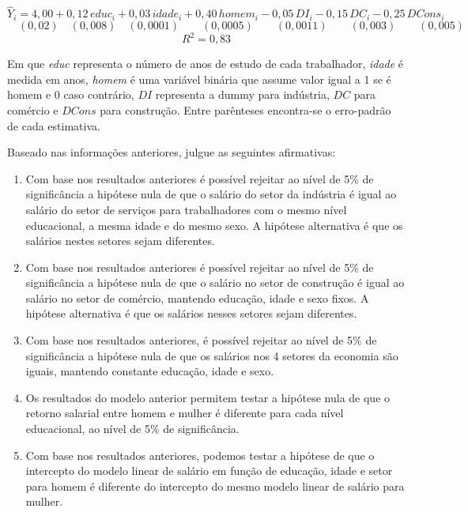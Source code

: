 \documentclass[12pt,letterpaper,onecolumn]{exam}
\begin{document}
\begin{questions}
\[
\hat{Y}_i = 4{,}00 + 0{,}12\,educ_i + 0{,}03\,idade_i + 0{,}40\,homem_i - 0{,}05\,DI_i - 0{,}15\,DC_i - 0{,}25\,DCons_i
\]
\vspace{-0.8cm}
\[
\quad (0{,}02)\quad (0{,}008)\quad (0{,}0001)\qquad (0{,}0005)\qquad (0{,}0011)\qquad (0{,}003)\qquad (0{,}005)
\]
\[
R^2 = 0{,}83
\]

Em que \textit{educ} representa o número de anos de estudo de cada trabalhador, \textit{idade} é medida em anos, \textit{homem} é uma variável binária que assume valor igual a 1 se é homem e 0 caso contrário, \(DI\) representa a dummy para indústria, \(DC\) para comércio e \(DCons\) para construção. Entre parênteses encontra-se o erro-padrão de cada estimativa.

Baseado nas informações anteriores, julgue as seguintes afirmativas:
\begin{enumerate}[label=(\arabic*)]
    \item Com base nos resultados anteriores é possível rejeitar ao nível de 5\% de significância a hipótese nula de que o salário do setor da indústria é igual ao salário do setor de serviços para trabalhadores com o mesmo nível educacional, a mesma idade e do mesmo sexo. A hipótese alternativa é que os salários nestes setores sejam diferentes.
    \item Com base nos resultados anteriores é possível rejeitar ao nível de 5\% de significância a hipótese nula de que o salário no setor de construção é igual ao salário no setor de comércio, mantendo educação, idade e sexo fixos. A hipótese alternativa é que os salários nesses setores sejam diferentes.
    \item Com base nos resultados anteriores, é possível rejeitar ao nível de 5\% de significância a hipótese nula de que os salários nos 4 setores da economia são iguais, mantendo constante educação, idade e sexo.
    \item Os resultados do modelo anterior permitem testar a hipótese nula de que o retorno salarial entre homem e mulher é diferente para cada nível educacional, ao nível de 5\% de significância.
    \item Com base nos resultados anteriores, podemos testar a hipótese de que o intercepto do modelo linear de salário em função de educação, idade e setor para homem é diferente do intercepto do mesmo modelo linear de salário para mulher.
\end{enumerate}


\vspace{0.7cm}


\end{questions}
\end{document}
